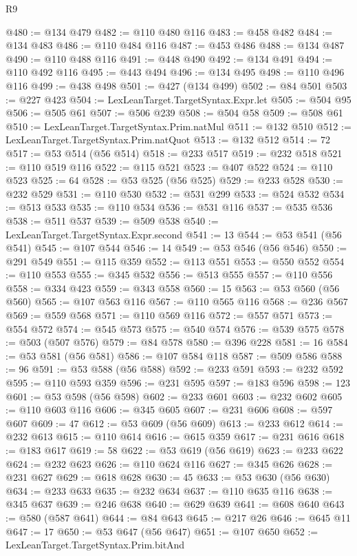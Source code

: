 \begin{lexlean}{R9}
\begin{coremodule}
@480 := @134 @479
@482 := @110 @480 @116
@483 := @458 @482
@484 := @134 @483
@486 := @110 @484 @116
@487 := @453 @486
@488 := @134 @487
@490 := @110 @488 @116
@491 := @448 @490
@492 := @134 @491
@494 := @110 @492 @116
@495 := @443 @494
@496 := @134 @495
@498 := @110 @496 @116
@499 := @438 @498
@501 := @427 (@134 @499)
@502 := @84 @501
@503 := @227 @423
@504 := LexLeanTarget.TargetSyntax.Expr.let
@505 := @504 @95
@506 := @505 @61
@507 := @506 @239
@508 := @504 @58
@509 := @508 @61
@510 := LexLeanTarget.TargetSyntax.Prim.natMul
@511 := @132 @510
@512 := LexLeanTarget.TargetSyntax.Prim.natQuot
@513 := @132 @512
@514 := 72
@517 := @53 @514 (@56 @514)
@518 := @233 @517
@519 := @232 @518
@521 := @110 @519 @116
@522 := @115 @521
@523 := @407 @522
@524 := @110 @523
@525 := 64
@528 := @53 @525 (@56 @525)
@529 := @233 @528
@530 := @232 @529
@531 := @110 @530
@532 := @531 @299
@533 := @524 @532
@534 := @513 @533
@535 := @110 @534
@536 := @531 @116
@537 := @535 @536
@538 := @511 @537
@539 := @509 @538
@540 := LexLeanTarget.TargetSyntax.Expr.second
@541 := 13
@544 := @53 @541 (@56 @541)
@545 := @107 @544
@546 := 14
@549 := @53 @546 (@56 @546)
@550 := @291 @549
@551 := @115 @359
@552 := @113 @551
@553 := @550 @552
@554 := @110 @553
@555 := @345 @532
@556 := @513 @555
@557 := @110 @556
@558 := @334 @423
@559 := @343 @558
@560 := 15
@563 := @53 @560 (@56 @560)
@565 := @107 @563 @116
@567 := @110 @565 @116
@568 := @236 @567
@569 := @559 @568
@571 := @110 @569 @116
@572 := @557 @571
@573 := @554 @572
@574 := @545 @573
@575 := @540 @574
@576 := @539 @575
@578 := @503 (@507 @576)
@579 := @84 @578
@580 := @396 @228
@581 := 16
@584 := @53 @581 (@56 @581)
@586 := @107 @584 @118
@587 := @509 @586
@588 := 96
@591 := @53 @588 (@56 @588)
@592 := @233 @591
@593 := @232 @592
@595 := @110 @593 @359
@596 := @231 @595
@597 := @183 @596
@598 := 123
@601 := @53 @598 (@56 @598)
@602 := @233 @601
@603 := @232 @602
@605 := @110 @603 @116
@606 := @345 @605
@607 := @231 @606
@608 := @597 @607
@609 := 47
@612 := @53 @609 (@56 @609)
@613 := @233 @612
@614 := @232 @613
@615 := @110 @614
@616 := @615 @359
@617 := @231 @616
@618 := @183 @617
@619 := 58
@622 := @53 @619 (@56 @619)
@623 := @233 @622
@624 := @232 @623
@626 := @110 @624 @116
@627 := @345 @626
@628 := @231 @627
@629 := @618 @628
@630 := 45
@633 := @53 @630 (@56 @630)
@634 := @233 @633
@635 := @232 @634
@637 := @110 @635 @116
@638 := @345 @637
@639 := @246 @638
@640 := @629 @639
@641 := @608 @640
@643 := @580 (@587 @641)
@644 := @84 @643
@645 := @217 @26
@646 := @645 @11
@647 := 17
@650 := @53 @647 (@56 @647)
@651 := @107 @650
@652 := LexLeanTarget.TargetSyntax.Prim.bitAnd

\end{coremodule}
\end{lexlean}
